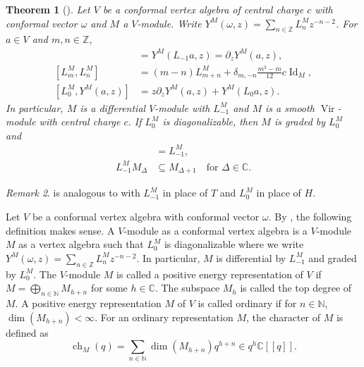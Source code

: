 \documentclass[a4paper, 12pt, reqno]{amsart}
\newtheorem{theorem}{Theorem}[subsection]
\theoremstyle{remark}
\newtheorem{remark}[theorem]{Remark}
\numberwithin{equation}{subsection}
\DeclareMathOperator{\Vir}{Vir}
\DeclareMathOperator{\Id}{Id}
\DeclareMathOperator{\ch}{ch}
\begin{document}
\begin{theorem}[{\cite[Proposition 4.1.5 and (4.1.18)]{lepowsky_introduction_2004}}]
  \label{thr:23}
  Let $V$ be a conformal vertex algebra of central charge $c$ with conformal vector $\omega$ and $M$ a $V$-module.
  Write $Y^M(\omega, z) = \sum_{n \in \mathbb{Z}}L^M_nz^{-n - 2}$.
  For $a \in V$ and $m, n \in \mathbb{Z}$,
  \begin{align*}
    [L^M_{-1}, Y^M(a, z)] &= Y^M(L_{-1}a, z) = \partial_zY^M(a, z), \\
    [L^M_m, L^M_n] &=(m - n)L^M_{m + n} + \delta_{m, -n}\frac{m^3 - m}{12}c\Id_M, \\
    [L^M_0, Y^M(a, z)] &= z\partial_zY^M(a, z) + Y^M(L_0a, z).
  \end{align*}
  In particular, $M$ is a differential $V$-module with $L_{-1}^M $ and $M$ is a smooth $\Vir$-module with central charge $c$.
  If $L^M_0$ is diagonalizable, then $M$ is graded by $L_0^M$ and
  \begin{align*}
    [L_0^M,L_{-1}^M]&=L_{-1}^M, \\
    L^M_{-1}M_\Delta&\subseteq M_{\Delta+1} \quad \text{for }\Delta \in \mathbb{C}.
  \end{align*}
\end{theorem}

\begin{remark}
  \label{rmk:21}
   is analogous to  with $L_{-1}^M$ in place of $T$ and $L_0^M$ in place of $H$.
\end{remark}

Let $V$ be a conformal vertex algebra with conformal vector $\omega$.
By , the following definition makes sense.
A $V$-module as a conformal vertex algebra is a $V$-module $M$ as a vertex algebra such that $L^M_0$ is diagonalizable where we write $Y^M(\omega, z) = \sum_{n \in \mathbb{Z}}L^M_nz^{-n - 2}$.
In particular, $M$ is differential by $L^M_{-1}$ and graded by $L^M_0$.
The $V$-module $M$ is called a positive energy representation of $V$ if $M = \bigoplus_{n \in \mathbb{N}}M_{h + n}$ for some $h \in \mathbb{C}$.
The subspace $M_h$ is called the top degree of $M$.
A positive energy representation $M$ of $V$ is called ordinary if for $n \in \mathbb{N}$, $\dim(M_{h + n}) < \infty$.
For an ordinary representation $M$, the character of $M$ is defined as
\begin{equation*}
  \ch_M(q) = \sum_{n \in \mathbb{N}}\dim(M_{h + n})q^{h + n} \in q^h\mathbb{C}[[q]].
\end{equation*}
\end{document}
